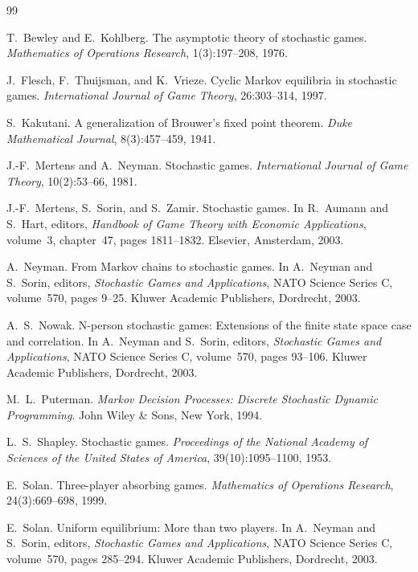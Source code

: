 \documentclass[12pt]{article}
\theoremstyle{definition}
\newcommand{\1}{\mathbf{1}}
\begin{document}
\begin{thebibliography}{99}

T.~Bewley and E.~Kohlberg.
\newblock The asymptotic theory of stochastic games.
\newblock \emph{Mathematics of Operations Research}, 1(3):197--208, 1976.

J.~Flesch, F.~Thuijsman, and K.~Vrieze.
\newblock Cyclic {M}arkov equilibria in stochastic games.
\newblock \emph{International Journal of Game Theory}, 26:303--314, 1997.

S.~Kakutani.
\newblock A generalization of {B}rouwer's fixed point theorem.
\newblock \emph{Duke Mathematical Journal}, 8(3):457--459, 1941.

J.-F.~Mertens and A.~Neyman.
\newblock Stochastic games.
\newblock \emph{International Journal of Game Theory}, 10(2):53--66, 1981.

J.-F.~Mertens, S.~Sorin, and S.~Zamir.
\newblock Stochastic games.
\newblock In R.~Aumann and S.~Hart, editors, \emph{Handbook of Game Theory with
Economic Applications}, volume~3, chapter~47, pages 1811--1832. Elsevier,
Amsterdam, 2003.

A.~Neyman.
\newblock From {M}arkov chains to stochastic games.
\newblock In A.~Neyman and S.~Sorin, editors, \emph{Stochastic Games and
Applications}, NATO Science Series C, volume~570, pages 9--25. Kluwer Academic
Publishers, Dordrecht, 2003.

A.~S.~Nowak.
\newblock N-person stochastic games: Extensions of the finite state space case and
correlation.
\newblock In A.~Neyman and S.~Sorin, editors, \emph{Stochastic Games and
Applications}, NATO Science Series C, volume~570, pages 93--106. Kluwer Academic
Publishers, Dordrecht, 2003.

M.~L.~Puterman.
\newblock \emph{Markov Decision Processes: Discrete Stochastic Dynamic
Programming}.
\newblock John Wiley \& Sons, New York, 1994.

L.~S.~Shapley.
\newblock Stochastic games.
\newblock \emph{Proceedings of the National Academy of Sciences of the United
States of America}, 39(10):1095--1100, 1953.

E.~Solan.
\newblock Three-player absorbing games.
\newblock \emph{Mathematics of Operations Research}, 24(3):669--698, 1999.

E.~Solan.
\newblock Uniform equilibrium: More than two players.
\newblock In A.~Neyman and S.~Sorin, editors, \emph{Stochastic Games and
Applications}, NATO Science Series C, volume~570, pages 285--294. Kluwer Academic
Publishers, Dordrecht, 2003.


\end{thebibliography}
\end{document}
